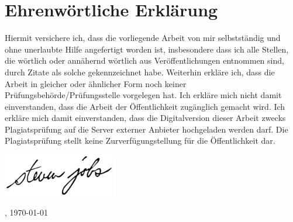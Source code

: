 \section*{Ehrenwörtliche Erklärung}
    Hiermit versichere ich, dass die vorliegende Arbeit von mir selbstständig und ohne unerlaubte Hilfe angefertigt worden ist, insbesondere dass ich alle Stellen, die wörtlich oder annähernd wörtlich aus Veröffentlichungen entnommen sind, durch Zitate als solche gekennzeichnet habe.
    Weiterhin erkläre ich, dass die Arbeit in gleicher oder ähnlicher Form noch keiner Prüfungsbehörde/Prüfungsstelle vorgelegen hat.
    \newline
    Ich erkläre mich nicht damit einverstanden, dass die Arbeit der Öffentlichkeit zugänglich gemacht wird.
    Ich erkläre mich damit einverstanden, dass die Digitalversion dieser Arbeit zwecks Plagiatsprüfung auf die Server externer Anbieter hochgeladen werden darf.
    Die Plagiatsprüfung stellt keine Zurverfügungstellung für die Öffentlichkeit dar.
    \newline

    \begin{flushright}
        \includegraphics[width=5cm]{abbildungen/unterschrift.png}
    \end{flushright}
    \begin{minipage}{0.48\textwidth}
        \begin{flushleft}
            \metaOrt{}, \today
        \end{flushleft}
    \end{minipage}
    \begin{minipage}{0.48\textwidth}
        \begin{flushright}
            \metaAutor{}
        \end{flushright}
    \end{minipage}
